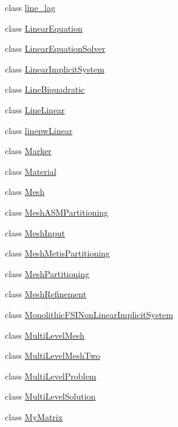 \begin{DoxyCompactItemize}
\item 
class \mbox{\hyperlink{classfemus_1_1line__lag}{line\+\_\+lag}}
\item 
class \mbox{\hyperlink{classfemus_1_1_linear_equation}{Linear\+Equation}}
\item 
class \mbox{\hyperlink{classfemus_1_1_linear_equation_solver}{Linear\+Equation\+Solver}}
\item 
class \mbox{\hyperlink{classfemus_1_1_linear_implicit_system}{Linear\+Implicit\+System}}
\item 
class \mbox{\hyperlink{classfemus_1_1_line_biquadratic}{Line\+Biquadratic}}
\item 
class \mbox{\hyperlink{classfemus_1_1_line_linear}{Line\+Linear}}
\item 
class \mbox{\hyperlink{classfemus_1_1linepw_linear}{linepw\+Linear}}
\item 
class \mbox{\hyperlink{classfemus_1_1_marker}{Marker}}
\item 
class \mbox{\hyperlink{classfemus_1_1_material}{Material}}
\item 
class \mbox{\hyperlink{classfemus_1_1_mesh}{Mesh}}
\item 
class \mbox{\hyperlink{classfemus_1_1_mesh_a_s_m_partitioning}{Mesh\+A\+S\+M\+Partitioning}}
\item 
class \mbox{\hyperlink{classfemus_1_1_mesh_input}{Mesh\+Input}}
\item 
class \mbox{\hyperlink{classfemus_1_1_mesh_metis_partitioning}{Mesh\+Metis\+Partitioning}}
\item 
class \mbox{\hyperlink{classfemus_1_1_mesh_partitioning}{Mesh\+Partitioning}}
\item 
class \mbox{\hyperlink{classfemus_1_1_mesh_refinement}{Mesh\+Refinement}}
\item 
class \mbox{\hyperlink{classfemus_1_1_monolithic_f_s_i_non_linear_implicit_system}{Monolithic\+F\+S\+I\+Non\+Linear\+Implicit\+System}}
\item 
class \mbox{\hyperlink{classfemus_1_1_multi_level_mesh}{Multi\+Level\+Mesh}}
\item 
class \mbox{\hyperlink{classfemus_1_1_multi_level_mesh_two}{Multi\+Level\+Mesh\+Two}}
\item 
class \mbox{\hyperlink{classfemus_1_1_multi_level_problem}{Multi\+Level\+Problem}}
\item 
class \mbox{\hyperlink{classfemus_1_1_multi_level_solution}{Multi\+Level\+Solution}}
\item 
class \mbox{\hyperlink{classfemus_1_1_my_matrix}{My\+Matrix}}

\end{DoxyCompactItemize}
